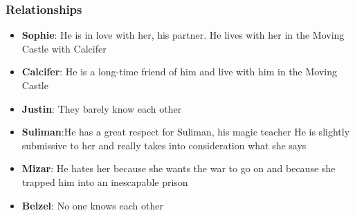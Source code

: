 




\subsubsection*{Relationships}
\begin{itemize}
\item \textbf{Sophie}: He is in love with her, his partner. He lives with her in the Moving Castle
        with Calcifer
\item \textbf{Calcifer}: He is a long-time friend of him and live with him in the Moving Castle
\item \textbf{Justin}: They barely know each other
\item \textbf{Suliman}:He has a great respect for Suliman, his magic teacher
             He is slightly submissive to her and really takes into consideration what she says
\item \textbf{Mizar}: He hates her because she wants the war to go on and because she trapped him into an inescapable prison 
\item \textbf{Belzel}: No one knows each other
\end{itemize}

